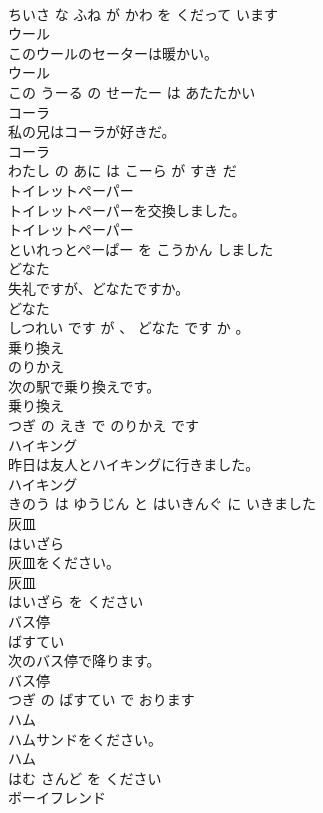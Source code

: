 \documentclass[8pt]{extreport}
\begin{document}
\begin{CJK}{UTF8}{min}
\\	ちいさ な ふね が かわ を くだって います			
\\	ウール	
\\	このウールのセーターは暖かい。	
\\	ウール 
\\	この うーる の せーたー は あたたかい			
\\	コーラ	
\\	私の兄はコーラが好きだ。	
\\	コーラ 
\\	わたし の あに は こーら が すき だ			
\\	トイレットペーパー	
\\	トイレットペーパーを交換しました。	
\\	トイレットペーパー 
\\	といれっとぺーぱー を こうかん しました			
\\	どなた	
\\	失礼ですが、どなたですか。	
\\	どなた 
\\	しつれい です が 、 どなた です か 。			
\\	乗り換え	
\\	のりかえ			
\\	次の駅で乗り換えです。	
\\	乗り換え 
\\	つぎ の えき で のりかえ です			
\\	ハイキング	
\\	昨日は友人とハイキングに行きました。	
\\	ハイキング 
\\	きのう は ゆうじん と はいきんぐ に いきました			
\\	灰皿	
\\	はいざら			
\\	灰皿をください。	
\\	灰皿 
\\	はいざら を ください			
\\	バス停	
\\	ばすてい			
\\	次のバス停で降ります。	
\\	バス停 
\\	つぎ の ばすてい で おります			
\\	ハム	
\\	ハムサンドをください。	
\\	ハム 
\\	はむ さんど を ください			
\\	ボーイフレンド	

\end{CJK}
\end{document}

